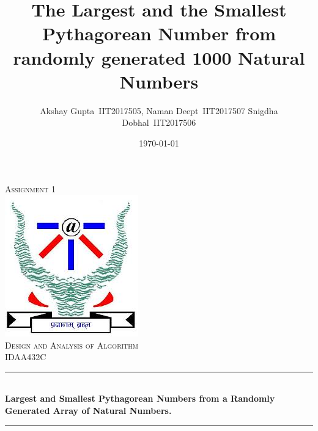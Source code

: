 \documentclass[twocolumn]{article}      %
\title{The Largest and the Smallest Pythagorean Number from randomly generated 1000 Natural Numbers}  %
\author{Akshay Gupta~{IIT2017505}, \hspace{6pt}Naman Deept~{IIT2017507}  \hspace{6pt}Snigdha Dobhal~{IIT2017506}
 }
\date{\today}      %
\begin{document}
\begin{titlepage}

\newcommand{\HRule}{\rule{\linewidth}{0.5mm}} %

\center %
 

\textsc{\LARGE Assignment 1}\\[1.5cm] %
\includegraphics[scale=0.7]{iiitlogo.jpg}\\[1cm] %
\textsc{\Large Design and Analysis of Algorithm}\\[0.5cm] %
\textsc{\large IDAA432C}\\[0.5cm] %


\HRule \\[0.4cm]
{ \large \bfseries Largest and Smallest Pythagorean Numbers from a Randomly Generated Array of Natural Numbers. }\\[0.4cm] %
\HRule \\[1.5cm]
 


\end{titlepage}
\end{document}
